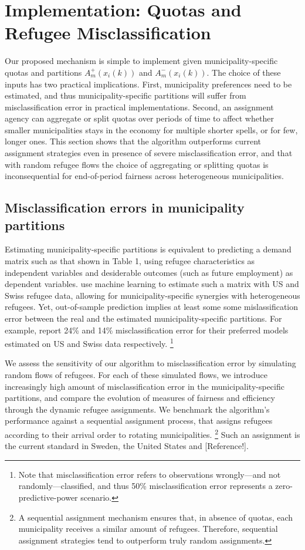 \documentclass[11pt]{article}
\begin{document}
\section{Implementation: Quotas and Refugee Misclassification}

Our proposed mechanism is simple to implement given municipality-specific quotas and partitions $A^+_m(x_i(k))$ and $A^-_m(x_i(k))$. The choice of these inputs has two practical implications. First, municipality preferences need to be estimated, and thus municipality-specific partitions will suffer from misclassification error in practical implementations. Second, an assignment agency can aggregate or split quotas over periods of time to affect whether smaller municipalities stays in the economy for multiple shorter spells, or for few, longer ones. This section shows that the algorithm outperforms current assignment strategies even in presence of severe misclassification error, and that with random refugee flows the choice of aggregating or splitting quotas is inconsequential for end-of-period fairness across heterogeneous municipalities.

\subsection{Misclassification errors in municipality partitions}


Estimating municipality-specific partitions is equivalent to predicting a demand matrix such as that shown in Table 1, using refugee characteristics as independent variables and desiderable outcomes (such as future employment) as dependent variables. \cite{bansak_improving_2018} use machine learning to estimate such a matrix with US and Swiss refugee data, allowing for municipality-specific synergies with heterogeneous refugees. Yet, out-of-sample prediction implies at least some some mislassification error between the real and the estimated municipality-specific partitions. For example, \cite{bansak_improving_2018} report 24\% and 14\% misclassification error for their preferred models estimated on US and Swiss data respectively. \footnote{Note that misclassification error refers to observations wrongly---and not randomly---classified, and thus 50\% misclassification error represents a zero-predictive-power scenario.}

We assess the sensitivity of our algorithm to misclassification error by simulating random flows of refugees. For each of these simulated flows, we introduce increasingly high amount of misclassification error in the municipality-specific partitions, and compare the evolution of measures of fairness and efficiency through the dynamic refugee assignments. We benchmark the algorithm's performance against a sequential assignment process, that assigns refugees according to their arrival order to rotating municipalities. \footnote{A sequential assignment mechanism ensures that, in absence of quotas, each municipality receives a similar amount of refugees. Therefore, sequential assignment strategies tend to outperform truly random assignments.} Such an assignment is the current standard in Sweden, the United States and [Reference!].
\end{document}
